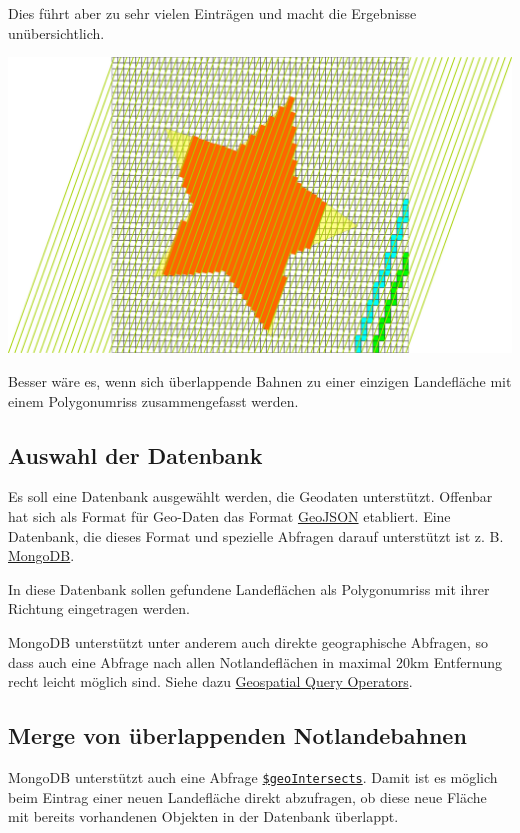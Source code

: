 \documentclass[
11pt, %
a4paper, %
oneside, %
pdfspacing, %
headinclude,
BCOR5mm, %
ngerman, %
bibtotocnumbered,
]{scrartcl}
\begin{document}
Dies führt aber zu sehr vielen Einträgen und macht die Ergebnisse unübersichtlich.

\includegraphics[width=\textwidth]{./drawings/ueberlappendeBahnen.png}

Besser wäre es, wenn sich überlappende Bahnen zu einer einzigen Landefläche mit einem Polygonumriss zusammengefasst werden. 

\subsection{Auswahl der Datenbank}

Es soll eine Datenbank ausgewählt werden, die Geodaten unterstützt. Offenbar hat sich als Format für Geo-Daten das Format \href{http://geojson.org/}{GeoJSON} etabliert. Eine Datenbank, die dieses Format und spezielle Abfragen darauf unterstützt ist z. B. \href{https://docs.mongodb.com/}{MongoDB}.

In diese Datenbank sollen gefundene Landeflächen als Polygonumriss mit ihrer Richtung eingetragen werden.

MongoDB unterstützt unter anderem auch direkte geographische Abfragen, so dass auch eine Abfrage nach allen Notlandeflächen in maximal 20km Entfernung recht leicht möglich sind. Siehe dazu \href{https://docs.mongodb.com/manual/reference/operator/query-geospatial/}{Geospatial Query Operators}.

\subsection{Merge von überlappenden Notlandebahnen}

MongoDB unterstützt auch eine Abfrage \href{https://docs.mongodb.com/manual/reference/operator/query/geoIntersects/#op._S_geoIntersects}{\texttt{\$geoIntersects}}. Damit ist es möglich beim Eintrag einer neuen Landefläche direkt abzufragen, ob diese neue Fläche mit bereits vorhandenen Objekten in der Datenbank überlappt. 
\end{document}
